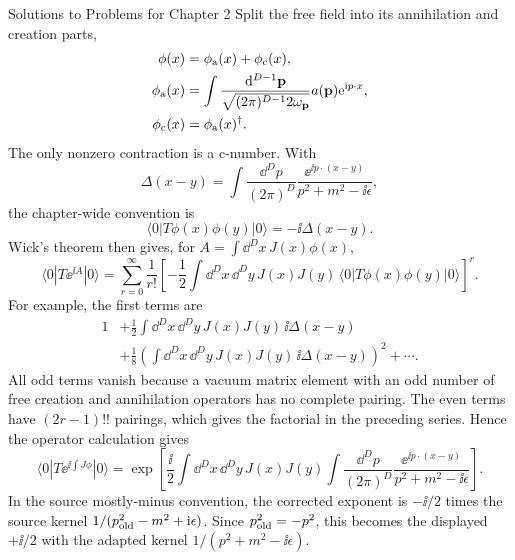 \begin{bankssolutions}{Solutions to Problems for Chapter 2}
Split the free field into its annihilation and creation parts,
\[
\begin{aligned}
  \phi(x)&=\phi_{\rm a}(x)+\phi_{\rm c}(x),\\
  \phi_{\rm a}(x)&=\int\frac{\mathop{}\!\mathrm{d}^{D-1}\mathbf p}{\sqrt{(2\pi)^{D-1}2\omega_{\mathbf p}}}
  a(\mathbf p)\mathrm{e}^{\mathrm{i} p\mathbin{\cdot}x},\\
  \phi_{\rm c}(x)&=\phi_{\rm a}(x)^{\dagger}.
\end{aligned}
\]
The only nonzero contraction is a c-number. With
\[
  \Delta(x-y)=\int\frac{\dd^{D}p}{(2\pi)^{D}}
  \frac{\ee^{\ii p\mathbin{\cdot}(x-y)}}{p^{2}+m^{2}-\ii\epsilon},
\]
the chapter-wide convention is
\[
  \langle0|T\phi(x)\phi(y)|0\rangle=-\ii\Delta(x-y).
\]
Wick's theorem then gives, for $A=\int\dd^{D}x\,J(x)\phi(x)$,
\[
  \langle0|T\ee^{\ii A}|0\rangle
  =\sum_{r=0}^{\infty}\frac{1}{r!}
    \left[-\frac12\int\dd^{D}x\,\dd^{D}y\,J(x)J(y)\,
    \langle0|T\phi(x)\phi(y)|0\rangle\right]^{r}.
\]
For example, the first terms are
\[
\begin{aligned}
  1&+\frac12\int\dd^{D}x\,\dd^{D}y\,J(x)J(y)\,\ii\Delta(x-y)\\
  &+\frac18\left(\int\dd^{D}x\,\dd^{D}y\,J(x)J(y)\,\ii\Delta(x-y)\right)^{2}+\cdots.
\end{aligned}
\]
All odd terms vanish because a vacuum matrix element with an odd number of free creation and annihilation operators has no complete pairing. The even terms have $(2r-1)!!$ pairings, which gives the factorial in the preceding series. Hence the operator calculation gives
\[
  \langle0|T\ee^{\ii\int J\phi}|0\rangle
  =\exp\!\left[\frac{\ii}{2}\int\dd^{D}x\,\dd^{D}y\,J(x)J(y)
  \int\frac{\dd^{D}p}{(2\pi)^{D}}
  \frac{\ee^{\ii p\mathbin{\cdot}(x-y)}}{p^{2}+m^{2}-\ii\epsilon}\right].
\]
In the source mostly-minus convention, the corrected exponent is $-\ii/2$ times the source kernel $1/(p_{\rm old}^{2}-m^{2}+\mathrm{i}\epsilon)$. Since $p_{\rm old}^{2}=-p^{2}$, this becomes the displayed $+\ii/2$ with the adapted kernel $1/(p^{2}+m^{2}-\ii\epsilon)$.


\end{bankssolutions}
